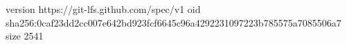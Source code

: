 version https://git-lfs.github.com/spec/v1
oid sha256:0caf23dd2cc007e642bd923fcf6645c96a4292231097223b785575a7085506a7
size 2541
